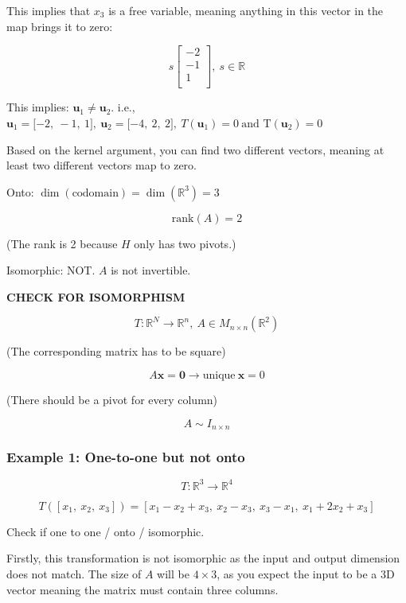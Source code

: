 \documentclass[12pt]{article}
\theoremstyle{plain}
\theoremstyle{remark}
\theoremstyle{definition}
\begin{document}
This implies that \(x_{3}\) is a free variable, meaning anything in this
vector in the map brings it to zero:

\[s\begin{bmatrix}
 - 2 \\
 - 1 \\
1 \\
\end{bmatrix},\ s\mathbb{\in R}\]

This implies: \({\mathbf{u}}_{1} \neq {\mathbf{u}}_{2}\). i.e.,
\({\mathbf{u}}_{1} = \lbrack - 2,\  - 1,\ 1\rbrack,\ {\mathbf{u}}_{2} = \lbrack - 4,\ 2,\ 2\rbrack,\ T\left( {\mathbf{u}}_{1} \right) = 0\ \text{and}\text{\ T}\left( {\mathbf{u}}_{2} \right) = 0\)

Based on the kernel argument, you can find two different vectors,
meaning at least two different vectors map to zero.

Onto:
\(\dim\left( \text{codomain} \right) = \dim\left( \mathbb{R}^{3} \right) = 3\)

\[\text{rank}(A) = 2\]

(The rank is 2 because \(H\) only has two pivots.)

Isomorphic: NOT. \(A\) is not invertible.

\textbf{CHECK FOR ISOMORPHISM}

\[T:\mathbb{R}^{N} \rightarrow \mathbb{R}^{n},\ A \in M_{n \times n}\left( \mathbb{R}^{2} \right)\]

(The corresponding matrix has to be square)

\[A\mathbf{x} = \mathbf{0} \rightarrow \text{unique}\ \mathbf{x} = 0\]

(There should be a pivot for every column)

\[A\sim I_{n \times n}\]


\subsubsection{Example 1: One-to-one but not
onto}

\[T:\mathbb{R}^{3} \rightarrow \mathbb{R}^{4}\]

\[{T\left( \left\lbrack x_{1},\ x_{2},\ x_{3} \right\rbrack \right) }{= \left\lbrack x_{1} - x_{2} + x_{3},\ x_{2} - x_{3},\ x_{3} - x_{1},\ x_{1} + 2x_{2} + x_{3} \right\rbrack} \]

Check if one to one / onto / isomorphic.

Firstly, this transformation is not isomorphic as the input and output
dimension does not match. The size of \(A\) will be \(4 \times 3\), as
you expect the input to be a 3D vector meaning the matrix must contain
three columns.
\end{document}
